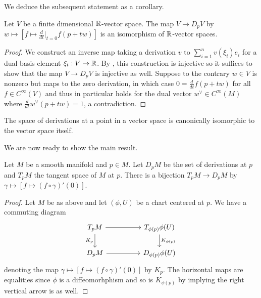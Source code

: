 We deduce the subsequent statement as a corollary. 
\begin{corollary}\label{corr: derivations gives iso of vector spaces}
    Let $V$ be a finite dimensional $\mathbb{R}$-vector space. The map $V\to D_{p}V$ by $w\mapsto[f\mapsto \frac{d}{dt}|_{t=0}f(p+tw)]$ is an isomorphism of $\mathbb{R}$-vector spaces. 
\end{corollary}
\begin{proof}
    We construct an inverse map taking a derivation $v$ to $\sum_{i=1}^{n}v(\xi_{i})e_{i}$ for a dual basis element $\xi_{i}:V\to\mathbb{R}$. By , this construction is injective so it suffices to show that the map $V\to D_{p}V$ is injective as well. Suppose to the contrary $w\in V$ is nonzero but maps to the zero derivation, in which case $0=\frac{d}{dt}f(p+tw)$ for all $f\in C^{\infty}(V)$ and thus in particular holds for the dual vector $w^{\vee}\in C^{\infty}(M)$ where $\frac{d}{dt}w^{\vee}(p+tw)=1$, a contradiction. 
\end{proof}
\begin{remark}
    The space of derivations at a point in a vector space is canonically isomorphic to the vector space itself. 
\end{remark}
We are now ready to show the main result. 
\begin{proposition}\label{prop: derivations equal to curve equivalence classes}
    Let $M$ be a smooth manifold and $p\in M$. Let $D_{p}M$ be the set of derivations at $p$ and $T_{p}M$ the tangent space of $M$ at $p$. There is a bijection $T_{p}M\to D_{p}M$ by $\gamma\mapsto[f\mapsto(f\circ\gamma)'(0)]$. 
\end{proposition}
\begin{proof}
    Let $M$ be as above and let $(\phi, U)$ be a chart centered at $p$. We have a commuting diagram 
    $$%
    \begin{tikzcd}
        {T_{p}M} && {T_{\phi(p)}\phi(U)} \\
        {D_{p}M} && {D_{\phi(p)}\phi(U)}
        \arrow[from=1-1, to=1-3]
        \arrow["{K_{p}}"', from=1-1, to=2-1]
        \arrow["{K_{\phi(p)}}", from=1-3, to=2-3]
        \arrow[from=2-1, to=2-3]
    \end{tikzcd}$$
    denoting the map $\gamma\mapsto[f\mapsto(f\circ\gamma)'(0)]$ by $K_{p}$. The horizontal maps are equalities since $\phi$ is a diffeomorhphism and so is $K_{\phi(p)}$ by  implying the right vertical arrow is as well. 
\end{proof}
